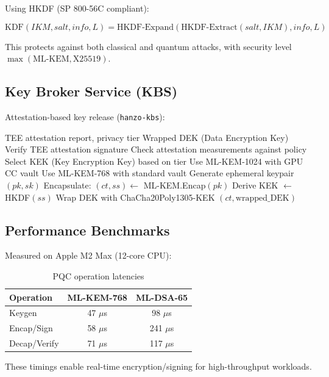 Using HKDF (SP 800-56C compliant):

\begin{equation}
\text{KDF}(IKM, salt, info, L) = \text{HKDF-Expand}(\text{HKDF-Extract}(salt, IKM), info, L)
\end{equation}

This protects against both classical and quantum attacks, with security level $\max(\text{ML-KEM}, \text{X25519})$.

\subsection{Key Broker Service (KBS)}

Attestation-based key release (\texttt{hanzo-kbs}):

\begin{algorithm}
\caption{PQC-Enhanced Key Release}
\begin{algorithmic}[1]
\REQUIRE TEE attestation report, privacy tier
\ENSURE Wrapped DEK (Data Encryption Key)
\STATE Verify TEE attestation signature
\STATE Check attestation measurements against policy
\STATE Select KEK (Key Encryption Key) based on tier
    \STATE Use ML-KEM-1024 with GPU CC vault
\ELSE
    \STATE Use ML-KEM-768 with standard vault
\ENDIF
\STATE Generate ephemeral keypair $(pk, sk)$
\STATE Encapsulate: $(ct, ss) \leftarrow$ ML-KEM.Encap$(pk)$
\STATE Derive KEK $\leftarrow$ HKDF$(ss)$
\STATE Wrap DEK with ChaCha20Poly1305-KEK
\RETURN $(ct, \text{wrapped\_DEK})$
\end{algorithmic}
\end{algorithm}

\subsection{Performance Benchmarks}

Measured on Apple M2 Max (12-core CPU):

\begin{table}[h]
\centering
\small
\begin{tabular}{|l|c|c|}
\hline
\textbf{Operation} & \textbf{ML-KEM-768} & \textbf{ML-DSA-65} \\
\hline
Keygen & 47 $\mu$s & 98 $\mu$s \\
Encap/Sign & 58 $\mu$s & 241 $\mu$s \\
Decap/Verify & 71 $\mu$s & 117 $\mu$s \\
\hline
\end{tabular}
\caption{PQC operation latencies}
\label{tab:pqc_perf}
\end{table}

These timings enable real-time encryption/signing for high-throughput workloads.

